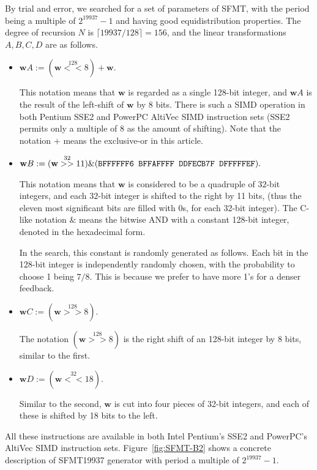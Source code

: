\documentclass{svmult}
\def\bw{{{\mathbf w}}}
\begin{document}
By trial and error, 
we searched for a set of parameters of SFMT,
with the period being a multiple of $2^{19937}-1$
and having good equidistribution properties.
The degree of recursion $N$ is $\lceil 19937/128 \rceil=156$, 
and the linear transformations $A,B,C,D$ are as follows.
\begin{itemize}
\item 
$\bw A := (\bw \stackrel{128}{<<} 8) + \bw.$

This notation means that $\bw$ is regarded
as a single 128-bit integer, and 
$\bw A$ is the result of the left-shift
of $\bw$ by 8 bits. There is such a SIMD operation
in both Pentium SSE2 and PowerPC AltiVec SIMD instruction 
sets (SSE2 permits only a multiple of 8
as the amount of shifting). 
Note that the notation $+$ means the exclusive-or
in this article.

\item
$\bw B := (\bw \stackrel{32}{>>} 11) \& (\mbox{\tt BFFFFFF6 BFFAFFFF DDFECB7F DFFFFFEF}).$

This notation means that $\bw$ is considered to be 
a quadruple of $32$-bit integers, and
each $32$-bit integer is shifted to the right by 11 bits,
(thus the eleven most significant bits are filled with 0s, 
for each 32-bit integer).
The C-like notation $\&$ means the bitwise AND
with a constant 128-bit integer,
denoted in the hexadecimal form.

In the search,
this constant is randomly generated as follows. 
Each bit in the 128-bit integer is independently 
randomly chosen, with the probability to choose 1 being $7/8$.
This is because we prefer to have more 1's for a denser 
feedback.

\item 
$\bw C := (\bw \stackrel{128}{>>} 8).$

The notation 
$(\bw \stackrel{128}{>>} 8)$ is the right shift of 
an 128-bit integer
by 8 bits, similar to the first.

\item
$\bw D := (\bw \stackrel{32}{<<} 18).$

Similar to the second,
$\bw$ is cut into four pieces of 32-bit integers,
and each of these is shifted by 18 bits to the left.
\end{itemize}
All these instructions are available in 
both Intel Pentium's SSE2 and PowerPC's AltiVec SIMD instruction sets.
Figure~\ref{fig:SFMT-B2} shows a concrete description
of SFMT19937 generator with period a multiple of $2^{19937}-1$.
\end{document}
